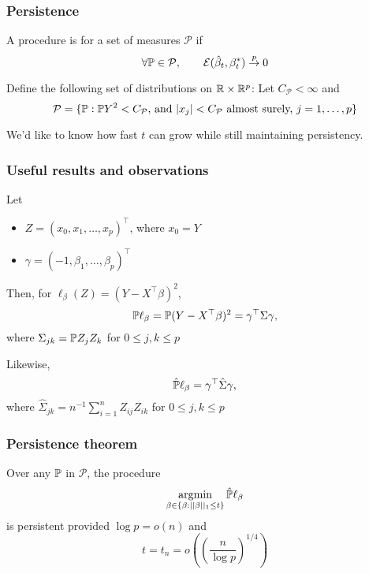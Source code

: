 \documentclass[12pt]{beamer}
\begin{document}
\begin{frame}
  \frametitle{Persistence}
 
  A procedure is  for a set of measures $\mathcal{P}$ if 
  \[
\forall \P \in \mathcal{P}, \qquad  \mathcal{E}(\hat\beta_t,\beta_t^*) \stackrel{p}{\rightarrow} 0
  \]
  \vsp

Define the following set of distributions on $\R \times \R^p$: Let $C_\mathcal{P} < \infty$ and 
\[
\mathcal{P} = \{ \P: \P Y^2 < C_\mathcal{P}\textrm{, and } |x_j| < C_\mathcal{P} \textrm{ almost surely, } j = 1,\ldots,p\}
\]

\vsp
We'd like to know how fast $t$ can grow while still maintaining persistency. 

\end{frame}

\begin{frame}
  \frametitle{Useful results and observations}
Let 
\begin{itemize}
\item $Z = (x_0, x_1, \ldots, x_p)^{\top}$, where $x_0 = Y$
\item $\gamma = (-1,\beta_1,\ldots,\beta_p)^{\top}$
\end{itemize}
Then, for $\ell_\beta(Z) = (Y - X^{\top}\beta)^2$,
\[
\P \ell_{\beta} = \P(Y - X^{\top}\beta)^2 = \gamma^{\top} \Sigma \gamma,
\]
where $\Sigma_{jk} = \P Z_j Z_k$ for $0 \leq j,k \leq p$

\vsp
Likewise, 
\[
\hat{\P}\ell_{\beta} = \gamma^{\top} \hat\Sigma \gamma,
\]
where $\hat\Sigma_{jk} = n^{-1} \sum_{i = 1}^n Z_{ij}Z_{ik}$ for $0 \leq j,k \leq p$

\end{frame}

\begin{frame}
  \frametitle{Persistence theorem}
\begin{theorem}
Over any $\P$ in $\mathcal{P}$, the procedure
\[
\argmin_{\beta \in \{\beta: ||\beta||_1 \leq t\}} \hat{\P} \ell_\beta
\]
is persistent provided $\log p = o(n)$ and 
\[
t = t_n =  o\left( \left(\frac{n}{\log p} \right)^{1/4} \right)
\]
\end{theorem}

\end{frame}
\end{document}
